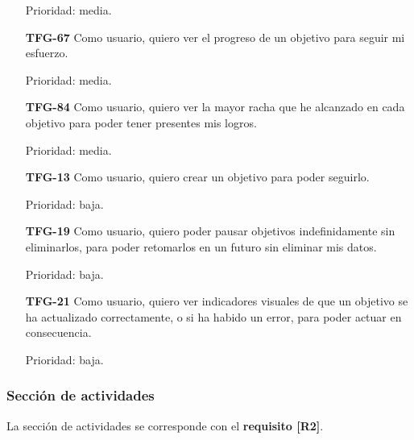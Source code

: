 \documentclass[10pt, a4paper]{aqademic}
\begin{document}
\begin{itemize}[leftmargin=16mm]
	Prioridad: media.
	
	\item [\textbf{TFG-67}] Como usuario, quiero ver el progreso de un objetivo para seguir mi esfuerzo.
	
	Prioridad: media.
	
	\item [\textbf{TFG-84}] Como usuario, quiero ver la mayor racha que he alcanzado en cada objetivo para poder tener presentes mis logros.
	
	Prioridad: media.
	
	\item [\textbf{TFG-13}] Como usuario, quiero crear un objetivo para poder seguirlo.
	
	Prioridad: baja.
	
	\item [\textbf{TFG-19}] Como usuario, quiero poder pausar objetivos indefinidamente sin eliminarlos, para poder retomarlos en un futuro sin eliminar mis datos.
	
	Prioridad: baja.
	
	\item [\textbf{TFG-21}] Como usuario, quiero ver indicadores visuales de que un objetivo se ha actualizado correctamente, o si ha habido un error, para poder actuar en consecuencia.
	
	Prioridad: baja.
\end{itemize}


\subsubsection*{Sección de actividades}

La sección de actividades se corresponde con el \textbf{requisito [R2]}.
\end{document}
